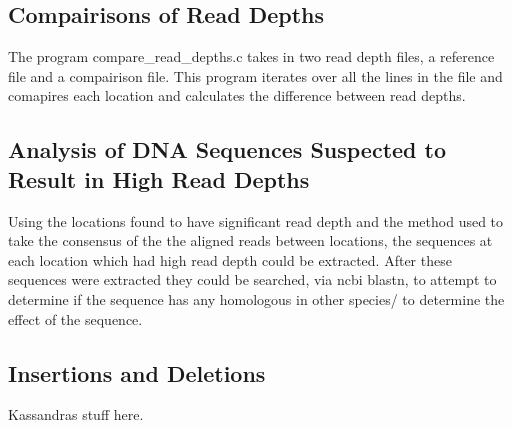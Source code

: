 \documentclass[../main.tex]{subfiles}
\begin{document}
\subsection{Compairisons of Read Depths}
	The program compare\_read\_depths.c takes in two read depth files, a reference file and a compairison file. This program iterates over all the lines in the file and comapires each location and calculates the difference between read depths.

\subsection{Analysis of DNA Sequences Suspected to Result in High Read Depths}
	Using the locations found to have significant read depth and the method used to take the consensus of the the aligned reads between locations, the sequences at each location which had high read depth could be extracted. After these sequences were extracted they could be searched, via ncbi blastn, to attempt to determine if the sequence has any homologous in other species/ to determine the effect of the sequence.

\subsection{Insertions and Deletions}

	Kassandras stuff here.
\end{document}
